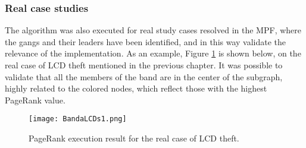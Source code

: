 \subsubsection{Real case studies}

The algorithm was also executed for real study cases resolved in the MPF, where the gangs and their leaders have been identified, and in this way validate the relevance of the implementation. As an example, Figure \ref{fig:BandaLCDs1} is shown below, on the real case of LCD theft mentioned in the previous chapter. It was possible to validate that all the members of the band are in the center of the subgraph, highly related to the colored nodes, which reflect those with the highest PageRank value.


\begin{figure}
	\centering
	\texttt{[image: BandaLCDs1.png]}
	\caption{PageRank execution result for the real case of LCD theft.} 
	\label{fig:BandaLCDs1}
\end{figure}
